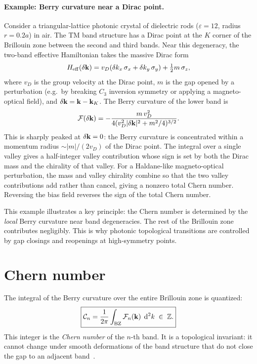 \paragraph{Example: Berry curvature near a Dirac point.}
Consider a triangular-lattice photonic crystal of dielectric rods
($\varepsilon = 12$, radius $r = 0.2a$) in air. The TM band structure
has a Dirac point at the $K$ corner of the Brillouin zone between the
second and third bands. Near this degeneracy, the two-band effective
Hamiltonian takes the massive Dirac form
\begin{equation}
 H_{\mathrm{eff}}(\delta\mathbf{k}) = v_D(\delta k_x\,\sigma_x + \delta k_y\,\sigma_y)
 + \tfrac{1}{2}m\,\sigma_z,
 \label{eq:dirac-berry-eff}
\end{equation}
where $v_D$ is the group velocity at the Dirac point, $m$ is the gap
opened by a perturbation (e.g.\ by breaking $C_3$ inversion symmetry or
applying a magneto-optical field), and $\delta\mathbf{k} = \mathbf{k} - \mathbf{k}_K$. The
Berry curvature of the lower band is
\begin{equation}
 \mathcal{F}(\delta\mathbf{k}) = -\frac{m\,v_D^2}
 {4(v_D^2|\delta\mathbf{k}|^2 + m^2/4)^{3/2}}.
 \label{eq:dirac-berry-curvature}
\end{equation}
This is sharply peaked at $\delta\mathbf{k} = 0$: the Berry curvature is
concentrated within a momentum radius $\sim |m|/(2v_D)$ of the Dirac
point. The integral over a single valley gives a half-integer valley
contribution whose sign is set by both the Dirac mass and the chirality
of that valley. For a Haldane-like magneto-optical perturbation, the
mass and valley chirality combine so that the two valley contributions
add rather than cancel, giving a nonzero total Chern number. Reversing
the bias field reverses the sign of the total Chern number.

This example illustrates a key principle: the Chern number is determined
by the \emph{local} Berry curvature near band degeneracies. The rest of
the Brillouin zone contributes negligibly. This is why photonic
topological transitions are controlled by gap closings and reopenings
at high-symmetry points.


\section{Chern number}
\label{sec:chern}

The integral of the Berry curvature over the entire Brillouin zone is
quantized:
\begin{equation}
 \boxed{
 \mathcal{C}_n = \frac{1}{2\pi}\int_{\mathrm{BZ}}\mathcal{F}_n(\mathbf{k})\;\mathop{}\!\mathrm{d}^2 k
 \;\in\;\mathbb{Z}.
 }
 \label{eq:chern}
\end{equation}
This integer is the \emph{Chern number} of the $n$-th band. It is a
topological invariant: it cannot change under smooth deformations of the
band structure that do not close the gap to an adjacent
band~\cite{paz2019tutorial}.

